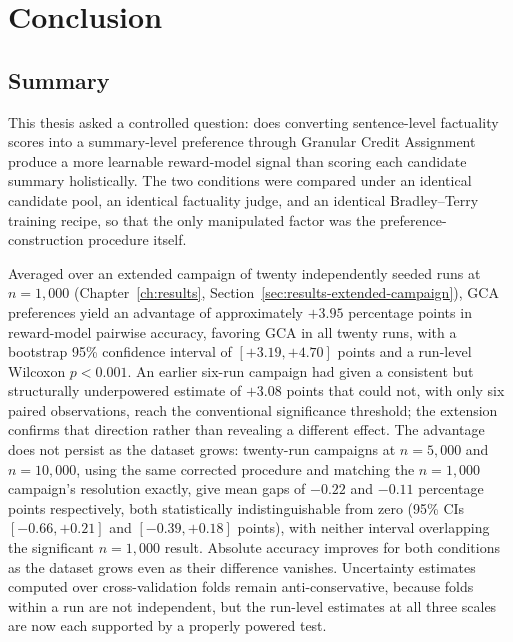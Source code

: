 \chapter{Conclusion}
\label{ch:conclusion}

\section{Summary}
\label{sec:concl-summary}

This thesis asked a controlled question: does converting sentence-level factuality
scores into a summary-level preference through Granular Credit Assignment produce a
more learnable reward-model signal than scoring each candidate summary
holistically. The two conditions were compared under an identical candidate pool,
an identical factuality judge, and an identical Bradley--Terry training recipe, so
that the only manipulated factor was the preference-construction procedure itself.

Averaged over an extended campaign of twenty independently seeded runs at
$n=1{,}000$ (Chapter~\ref{ch:results}, Section~\ref{sec:results-extended-campaign}),
GCA preferences yield an advantage of approximately $+3.95$ percentage points in
reward-model pairwise accuracy, favoring GCA in all twenty runs, with a
bootstrap 95\% confidence interval of $[+3.19, +4.70]$ points and a run-level
Wilcoxon $p<0.001$. An earlier six-run campaign had given a consistent but
structurally underpowered estimate of $+3.08$ points that could not, with only
six paired observations, reach the conventional significance threshold; the
extension confirms that direction rather than revealing a different effect. The
advantage does not persist as the dataset grows: twenty-run campaigns at
$n=5{,}000$ and $n=10{,}000$, using the same corrected procedure and matching
the $n=1{,}000$ campaign's resolution exactly, give mean gaps of $-0.22$ and
$-0.11$ percentage points respectively, both statistically indistinguishable
from zero (95\% CIs $[-0.66,+0.21]$ and $[-0.39,+0.18]$ points), with
neither interval overlapping the significant $n=1{,}000$ result.
Absolute accuracy improves for both conditions as the dataset grows even as
their difference vanishes. Uncertainty estimates computed over cross-validation
folds remain anti-conservative, because folds within a run are not independent,
but the run-level estimates at all three scales are now each supported by a
properly powered test.

